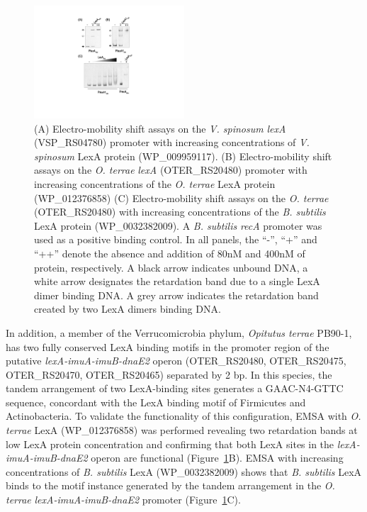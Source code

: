 \begin{figure}
  \centering
  \includegraphics[width=0.5\textwidth]{figures/chapter5/emsa1}
  \caption[Electro-mobility shift assays on Verrucomicrobia \textit{lexA}
  promoters.]{(A) Electro-mobility shift assays on the \textit{V. spinosum}
    \textit{lexA} (VSP\_RS04780) promoter with increasing concentrations of
    \textit{V. spinosum} LexA protein (WP\_009959117). (B) Electro-mobility
    shift assays on the \textit{O. terrae} \textit{lexA} (OTER\_RS20480)
    promoter with increasing concentrations of the \textit{O. terrae} LexA
    protein (WP\_012376858) (C) Electro-mobility shift assays on the
    \textit{O. terrae} (OTER\_RS20480) with increasing concentrations of the
    \textit{B. subtilis} LexA protein (WP\_0032382009). A \textit{B. subtilis}
    \textit{recA} promoter was used as a positive binding control.  In all
    panels, the ``-'', ``+'' and ``++'' denote the absence and addition of 80nM
    and 400nM of protein, respectively. A black arrow indicates unbound DNA, a
    white arrow designates the retardation band due to a single LexA dimer
    binding DNA\@. A grey arrow indicates the retardation band created by two
    LexA dimers binding DNA.}
  \label{fig:emsa1}
\end{figure}


In addition, a member of the Verrucomicrobia phylum, \textit{Opitutus terrae}
PB90-1, has two fully conserved LexA binding motifs in the promoter region of
the putative \textit{lexA-imuA-imuB-dnaE2} operon (OTER\_RS20480,
OTER\_RS20475, OTER\_RS20470, OTER\_RS20465) separated by 2 bp. In this
species, the tandem
arrangement of two LexA-binding sites generates a GAAC-N4-GTTC sequence,
concordant with the LexA binding motif of Firmicutes and Actinobacteria. To
validate the
functionality of this configuration, EMSA with \textit{O. terrae} LexA
(WP\_012376858) was performed revealing two retardation bands at low LexA
protein concentration and confirming that both LexA sites in the
\textit{lexA-imuA-imuB-dnaE2} operon are functional
(Figure~\ref{fig:emsa1}B). EMSA with increasing concentrations of
\textit{B. subtilis} LexA (WP\_0032382009) shows that \textit{B. subtilis} LexA
binds to the motif instance generated by the tandem arrangement in the
\textit{O. terrae} \textit{lexA-imuA-imuB-dnaE2} promoter (Figure~\ref{fig:emsa1}C).

